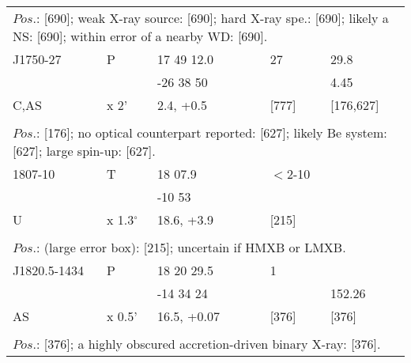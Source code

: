 \documentclass{aa}
\begin{document}
\begin{table*}[h]
\begin{tabular}{p{2.5cm}p{1cm}p{1.8cm}p{2.3cm}p{3.3cm}p{2.0cm}p{2.2cm}}
\\
\multicolumn{7}{p{17.5cm}}{
$Pos$.: [690];  weak X-ray source: [690]; hard X-ray spe.: [690]; likely a NS: [690]; 
within error of a nearby WD: [690].        }\\

\noalign{\smallskip}
\hline
\noalign{\smallskip}
J1750-27 &  P       &    17 49 12.0 &                &                 &     27       &      29.8 \\
                 &            &   -26 38 50    &                &                  &                 &      4.45  \\
C,AS       &   x 2'   &  2.4, +0.5       &                &                 &   [777]    &      [176,627] \\
  
\\
\multicolumn{7}{p{17.5cm}}{
$Pos$.: [176]; no optical counterpart reported: [627]; likely Be system: [627]; large spin-up: [627].       }\\

\noalign{\smallskip}
\hline
\noalign{\smallskip}
 1807-10      &  T                     & 18 07.9        &                    &                       & $<$2-10           &                        \\
                      &                          & -10 53          &                    &                      &                           &          \\
U                   & x 1.3$^\circ$  & 18.6, +3.9    &                     &                      & [215]                &   \\
\\
\multicolumn{7}{p{17.5cm}}{
$Pos$.: (large error box): [215]; uncertain if HMXB or LMXB. }\\

\noalign{\smallskip}
\hline
\noalign{\smallskip}
J1820.5-1434 &   P         & 18 20 29.5     &              &                & 1              &  \\             
                          &               & -14 34 24       &               &                &                & 152.26   \\         
AS                    &  x 0.5'    & 16.5, +0.07   &              &               &   [376]     & [376]     \\
  
\\
\multicolumn{7}{p{17.5cm}}{
$Pos$.: [376]; a highly obscured accretion-driven binary X-ray: [376].     }\\


\end{tabular}
\end{table*}
\end{document}

